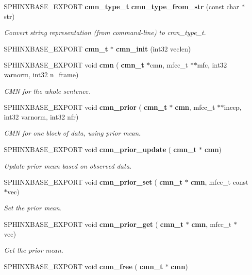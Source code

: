 \begin{DoxyCompactItemize}
\item 
\mbox{\label{cmn_8h_acf5e65a03a0d74630add4a400fed0ce8}} 
S\+P\+H\+I\+N\+X\+B\+A\+S\+E\+\_\+\+E\+X\+P\+O\+RT \textbf{ cmn\+\_\+type\+\_\+t} \textbf{ cmn\+\_\+type\+\_\+from\+\_\+str} (const char $\ast$str)
\begin{DoxyCompactList}\small\item\em Convert string representation (from command-\/line) to cmn\+\_\+type\+\_\+t. \end{DoxyCompactList}\item 
\mbox{\label{cmn_8h_a7ba6ce5489afce232b9bb61bd2ebd20f}} 
S\+P\+H\+I\+N\+X\+B\+A\+S\+E\+\_\+\+E\+X\+P\+O\+RT \textbf{ cmn\+\_\+t} $\ast$ {\bfseries cmn\+\_\+init} (int32 veclen)
\item 
S\+P\+H\+I\+N\+X\+B\+A\+S\+E\+\_\+\+E\+X\+P\+O\+RT void \textbf{ cmn} (\textbf{ cmn\+\_\+t} $\ast$cmn, mfcc\+\_\+t $\ast$$\ast$mfc, int32 varnorm, int32 n\+\_\+frame)
\begin{DoxyCompactList}\small\item\em C\+MN for the whole sentence. \end{DoxyCompactList}\item 
S\+P\+H\+I\+N\+X\+B\+A\+S\+E\+\_\+\+E\+X\+P\+O\+RT void \textbf{ cmn\+\_\+prior} (\textbf{ cmn\+\_\+t} $\ast$\textbf{ cmn}, mfcc\+\_\+t $\ast$$\ast$incep, int32 varnorm, int32 nfr)
\begin{DoxyCompactList}\small\item\em C\+MN for one block of data, using prior mean. \end{DoxyCompactList}\item 
\mbox{\label{cmn_8h_aae61df2ec71082520669fc63d94bb1ef}} 
S\+P\+H\+I\+N\+X\+B\+A\+S\+E\+\_\+\+E\+X\+P\+O\+RT void \textbf{ cmn\+\_\+prior\+\_\+update} (\textbf{ cmn\+\_\+t} $\ast$\textbf{ cmn})
\begin{DoxyCompactList}\small\item\em Update prior mean based on observed data. \end{DoxyCompactList}\item 
\mbox{\label{cmn_8h_a0f6f70d51143d6a33130650b8d4758ab}} 
S\+P\+H\+I\+N\+X\+B\+A\+S\+E\+\_\+\+E\+X\+P\+O\+RT void \textbf{ cmn\+\_\+prior\+\_\+set} (\textbf{ cmn\+\_\+t} $\ast$\textbf{ cmn}, mfcc\+\_\+t const $\ast$vec)
\begin{DoxyCompactList}\small\item\em Set the prior mean. \end{DoxyCompactList}\item 
\mbox{\label{cmn_8h_a4f624f5b805288f66fa05b79b1e4f383}} 
S\+P\+H\+I\+N\+X\+B\+A\+S\+E\+\_\+\+E\+X\+P\+O\+RT void \textbf{ cmn\+\_\+prior\+\_\+get} (\textbf{ cmn\+\_\+t} $\ast$\textbf{ cmn}, mfcc\+\_\+t $\ast$vec)
\begin{DoxyCompactList}\small\item\em Get the prior mean. \end{DoxyCompactList}\item 
\mbox{\label{cmn_8h_a0f70f378107e3d4e861e39d4f76d8d50}} 
S\+P\+H\+I\+N\+X\+B\+A\+S\+E\+\_\+\+E\+X\+P\+O\+RT void {\bfseries cmn\+\_\+free} (\textbf{ cmn\+\_\+t} $\ast$\textbf{ cmn})
\end{DoxyCompactItemize}
